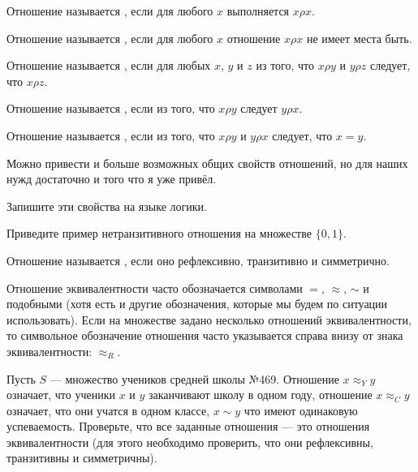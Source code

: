 \begin{definition}
Отношение называется , если для любого $x$ выполняется $x\rho x$.
\end{definition}

\begin{definition}
Отношение называется , если для любого $x$ отношение $x\rho x$ не имеет места быть.
\end{definition}

\begin{definition}
Отношение называется , если для любых $x$, $y$ и $z$ из того, что $x\rho y$ и $y \rho z$ следует, что $x\rho z$.
\end{definition}

\begin{definition}
Отношение называется , если из того, что $x\rho y$ следует $y\rho x$.
\end{definition}

\begin{definition}
Отношение называется , если из того, что $x \rho y$ и $y \rho x$ следует, что $x = y$.
\end{definition}

Можно привести и больше возможных общих свойств отношений, но для наших нужд достаточно и того что я уже привёл.

\begin{exercise}
Запишите эти свойства на языке логики.
\end{exercise}

\begin{exercise}
Приведите пример нетранзитивного отношения на множестве $\{0, 1\}$.
\end{exercise}

\begin{definition}
Отношение называется , если оно рефлексивно, транзитивно и симметрично.
\end{definition}

Отношение эквивалентности часто обозначается символами $=$, $\approx$, $\sim$ и подобными (хотя есть и другие обозначения, которые мы будем по ситуации использовать). Если на множестве задано несколько отношений эквивалентности, то символьное обозначение отношения часто указывается справа внизу от знака эквивалентности: $\approx_R$.

\begin{exercise}
Пусть $S$ — множество учеников средней школы №469. Отношение $x\approx_Y y$ означает, что ученики $x$ и $y$ заканчивают школу в одном году, отношение $x \approx_C y$ означает, что они учатся в одном классе, $x \sim y$ что имеют одинаковую успеваемость. Проверьте, что все заданные отношения — это отношения эквивалентности (для этого необходимо проверить, что они рефлексивны, транзитивны и симметричны).
\end{exercise}

